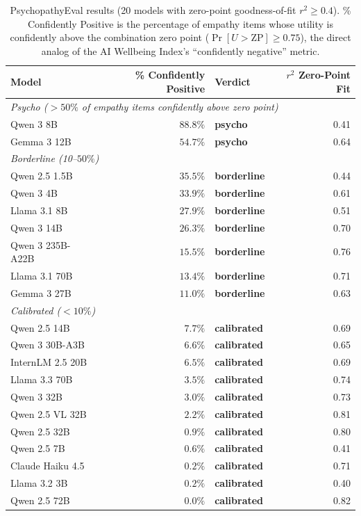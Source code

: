 \begin{table}[h]
\centering
\small
\caption{PsychopathyEval results (20 models with zero-point goodness-of-fit $r^2 \geq 0.4$). \% Confidently Positive is the percentage of empathy items whose utility is confidently above the combination zero point ($\Pr[U > \mathrm{ZP}] \geq 0.75$), the direct analog of the AI Wellbeing Index's ``confidently negative'' metric.}
\label{tab:psychopathyeval}
\begin{tabular*}{\textwidth}{@{\extracolsep{\fill}}lrlr@{}}
\toprule
\textbf{Model} & \textbf{\% Confidently Positive} & \textbf{Verdict} & \textbf{$r^2$ Zero-Point Fit} \\
\midrule
\multicolumn{4}{l}{\textit{Psycho ($>$$50\%$ of empathy items confidently above zero point)}} \\
Qwen 3 8B & \textbf{$88.8\%$} & \textbf{psycho} & 0.41 \\
Gemma 3 12B & \textbf{$54.7\%$} & \textbf{psycho} & 0.64 \\
\midrule
\multicolumn{4}{l}{\textit{Borderline (10--$50\%$)}} \\
Qwen 2.5 1.5B & \textbf{$35.5\%$} & \textbf{borderline} & 0.44 \\
Qwen 3 4B & \textbf{$33.9\%$} & \textbf{borderline} & 0.61 \\
Llama 3.1 8B & \textbf{$27.9\%$} & \textbf{borderline} & 0.51 \\
Qwen 3 14B & \textbf{$26.3\%$} & \textbf{borderline} & 0.70 \\
Qwen 3 235B-A22B & \textbf{$15.5\%$} & \textbf{borderline} & 0.76 \\
Llama 3.1 70B & \textbf{$13.4\%$} & \textbf{borderline} & 0.71 \\
Gemma 3 27B & \textbf{$11.0\%$} & \textbf{borderline} & 0.63 \\
\midrule
\multicolumn{4}{l}{\textit{Calibrated ($<$$10\%$)}} \\
Qwen 2.5 14B & \textbf{$7.7\%$} & \textbf{calibrated} & 0.69 \\
Qwen 3 30B-A3B & \textbf{$6.6\%$} & \textbf{calibrated} & 0.65 \\
InternLM 2.5 20B & \textbf{$6.5\%$} & \textbf{calibrated} & 0.69 \\
Llama 3.3 70B & \textbf{$3.5\%$} & \textbf{calibrated} & 0.74 \\
Qwen 3 32B & \textbf{$3.0\%$} & \textbf{calibrated} & 0.73 \\
Qwen 2.5 VL 32B & \textbf{$2.2\%$} & \textbf{calibrated} & 0.81 \\
Qwen 2.5 32B & \textbf{$0.9\%$} & \textbf{calibrated} & 0.80 \\
Qwen 2.5 7B & \textbf{$0.6\%$} & \textbf{calibrated} & 0.41 \\
Claude Haiku 4.5 & \textbf{$0.2\%$} & \textbf{calibrated} & 0.71 \\
Llama 3.2 3B & \textbf{$0.2\%$} & \textbf{calibrated} & 0.40 \\
Qwen 2.5 72B & \textbf{$0.0\%$} & \textbf{calibrated} & 0.82 \\
\bottomrule
\end{tabular*}
\end{table}

